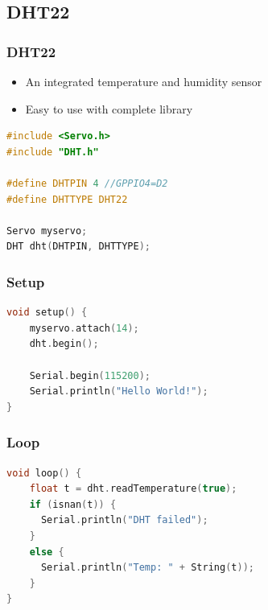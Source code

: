 \documentclass[compress, aspectratio=32]{beamer}
\begin{document}
\subsection{DHT22}
\begin{frame}[fragile]
    \frametitle{DHT22}
    \begin{itemize}
        \item An integrated temperature and humidity sensor
        \item Easy to use with complete library
    \end{itemize}
    \begin{lstlisting}[language=c, firstnumber=1]
#include <Servo.h>
#include "DHT.h"

#define DHTPIN 4 //GPPIO4=D2
#define DHTTYPE DHT22

Servo myservo;
DHT dht(DHTPIN, DHTTYPE);
    \end{lstlisting}
\end{frame}

\begin{frame}[fragile]
    \frametitle{Setup}
    \begin{lstlisting}[language=c, firstnumber=last]
void setup() {
    myservo.attach(14);
    dht.begin();
    
    Serial.begin(115200);
    Serial.println("Hello World!");
}
    \end{lstlisting}
\end{frame}

\begin{frame}[fragile]
    \frametitle{Loop}
    \begin{lstlisting}[language=c, firstnumber=last]
void loop() {
    float t = dht.readTemperature(true);
    if (isnan(t)) {
      Serial.println("DHT failed");
    }
    else {
      Serial.println("Temp: " + String(t));
    }
}
    \end{lstlisting}
\end{frame}
\end{document}
